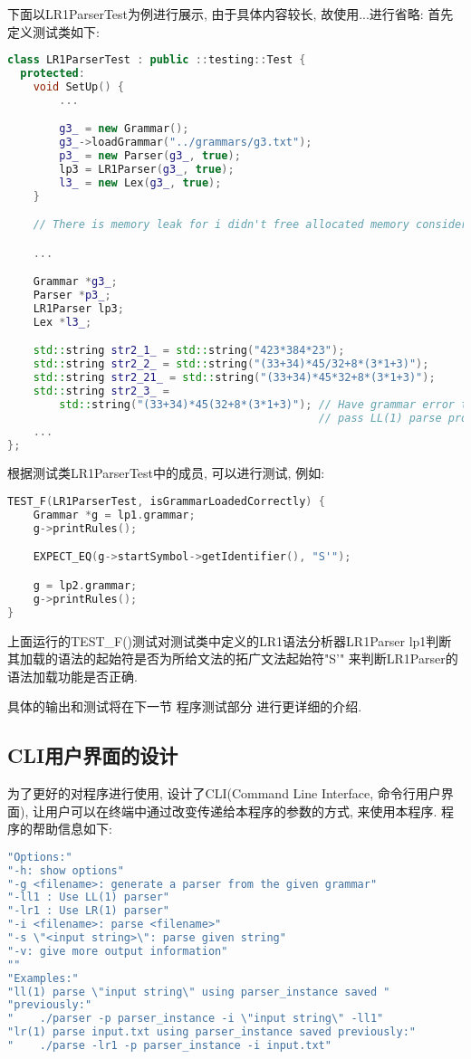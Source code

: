 下面以LR1ParserTest为例进行展示, 由于具体内容较长, 故使用...进行省略:
首先定义测试类如下:
\begin{lstlisting}[language=c++]
class LR1ParserTest : public ::testing::Test {
  protected:
    void SetUp() {
        ...

        g3_ = new Grammar();
        g3_->loadGrammar("../grammars/g3.txt");
        p3_ = new Parser(g3_, true);
        lp3 = LR1Parser(g3_, true);
        l3_ = new Lex(g3_, true);
    }

    // There is memory leak for i didn't free allocated memory considering tight time.

    ...

    Grammar *g3_;
    Parser *p3_;
    LR1Parser lp3;
    Lex *l3_;

    std::string str2_1_ = std::string("423*384*23");
    std::string str2_2_ = std::string("(33+34)*45/32+8*(3*1+3)");
    std::string str2_21_ = std::string("(33+34)*45*32+8*(3*1+3)");
    std::string str2_3_ =
        std::string("(33+34)*45(32+8*(3*1+3)"); // Have grammar error that can't
                                                // pass LL(1) parse process.
    ...
};
\end{lstlisting}

根据测试类LR1ParserTest中的成员, 可以进行测试, 例如:
\begin{lstlisting}[language=c++]
TEST_F(LR1ParserTest, isGrammarLoadedCorrectly) {
    Grammar *g = lp1.grammar;
    g->printRules();

    EXPECT_EQ(g->startSymbol->getIdentifier(), "S'");

    g = lp2.grammar;
    g->printRules();
}
\end{lstlisting}

上面运行的TEST\_F()测试对测试类中定义的LR1语法分析器LR1Parser
lp1判断其加载的语法的起始符是否为所给文法的拓广文法起始符"S'"
来判断LR1Parser的语法加载功能是否正确.

具体的输出和测试将在下一节 程序测试部分 进行更详细的介绍.

\subsection{CLI用户界面的设计}

为了更好的对程序进行使用, 设计了CLI(Command Line Interface, 命令行用户界面),
让用户可以在终端中通过改变传递给本程序的参数的方式, 来使用本程序.
程序的帮助信息如下:

\begin{lstlisting}[language=c++]
"Options:"
"-h: show options"
"-g <filename>: generate a parser from the given grammar"
"-ll1 : Use LL(1) parser"
"-lr1 : Use LR(1) parser"
"-i <filename>: parse <filename>"
"-s \"<input string>\": parse given string"
"-v: give more output information"
""
"Examples:"
"ll(1) parse \"input string\" using parser_instance saved "
"previously:"
"    ./parser -p parser_instance -i \"input string\" -ll1"
"lr(1) parse input.txt using parser_instance saved previously:"
"    ./parse -lr1 -p parser_instance -i input.txt"
\end{lstlisting}

